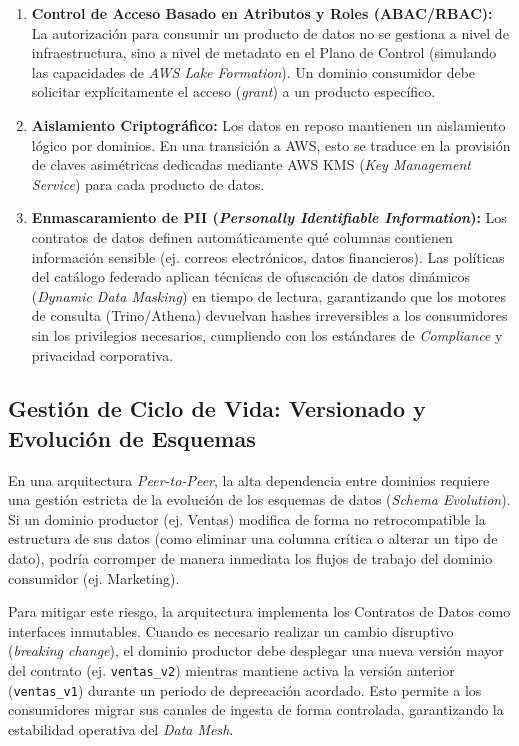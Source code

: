 \documentclass[12pt, a4paper]{article}
\begin{document}
\begin{enumerate}
    \item \textbf{Control de Acceso Basado en Atributos y Roles (ABAC/RBAC):} La autorización para consumir un producto de datos no se gestiona a nivel de infraestructura, sino a nivel de metadato en el Plano de Control (simulando las capacidades de \textit{AWS Lake Formation}). Un dominio consumidor debe solicitar explícitamente el acceso (\textit{grant}) a un producto específico.
    \item \textbf{Aislamiento Criptográfico:} Los datos en reposo mantienen un aislamiento lógico por dominios. En una transición a AWS, esto se traduce en la provisión de claves asimétricas dedicadas mediante AWS KMS (\textit{Key Management Service}) para cada producto de datos.
    \item \textbf{Enmascaramiento de PII (\textit{Personally Identifiable Information}):} Los contratos de datos definen automáticamente qué columnas contienen información sensible (ej. correos electrónicos, datos financieros). Las políticas del catálogo federado aplican técnicas de ofuscación de datos dinámicos (\textit{Dynamic Data Masking}) en tiempo de lectura, garantizando que los motores de consulta (Trino/Athena) devuelvan hashes irreversibles a los consumidores sin los privilegios necesarios, cumpliendo con los estándares de \textit{Compliance} y privacidad corporativa.
\end{enumerate}

\subsection{Gestión de Ciclo de Vida: Versionado y Evolución de Esquemas}

En una arquitectura \textit{Peer-to-Peer}, la alta dependencia entre dominios requiere una gestión estricta de la evolución de los esquemas de datos (\textit{Schema Evolution}). Si un dominio productor (ej. Ventas) modifica de forma no retrocompatible la estructura de sus datos (como eliminar una columna crítica o alterar un tipo de dato), podría corromper de manera inmediata los flujos de trabajo del dominio consumidor (ej. Marketing).

Para mitigar este riesgo, la arquitectura implementa los Contratos de Datos como interfaces inmutables. Cuando es necesario realizar un cambio disruptivo (\textit{breaking change}), el dominio productor debe desplegar una nueva versión mayor del contrato (ej. \texttt{ventas\_v2}) mientras mantiene activa la versión anterior (\texttt{ventas\_v1}) durante un periodo de deprecación acordado. Esto permite a los consumidores migrar sus canales de ingesta de forma controlada, garantizando la estabilidad operativa del \textit{Data Mesh}.
\end{document}
